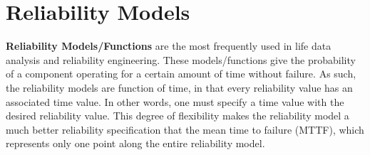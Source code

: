 \section{Reliability Models}
\label{sec:ReliabilityModels}

\newcommand{\aliasRequiredParameterDescription}[1]
{
	\xmlNode{#1}, \xmlDesc{string or float, required parameter}. See above definition.
	If a string was provided, the reliability model would treat it as an input variable that came
	from other entity of RAVEN. In this case, the variable must be listed in the sub-node
	\xmlNode{variables} under \xmlNode{ExternalModel}.
}
\newcommand{\aliasOptionalParameterDescription}[1]
{
	\xmlNode{#1}, \xmlDesc{string or float, optional parameter}. See above definition.
	If a string was provided, the reliability model would treat it as an input variable that came
	from other entity of RAVEN. In this case, the variable must be listed in the sub-node
	\xmlNode{variables} under \xmlNode{ExternalModel}.
	\default{1.}
}

\textbf{Reliability Models/Functions} are the most frequently used in life data analysis
and reliability engineering. These models/functions give the probability of a component
operating for a certain amount of time without failure. As such, the reliability models
are function of time, in that every reliability value has an associated time value. In
other words, one must specify a time value with the desired reliability value. This degree
of flexibility makes the reliability model a much better reliability specification that the
mean time to failure (MTTF), which represents only one point along the entire reliability
model.

